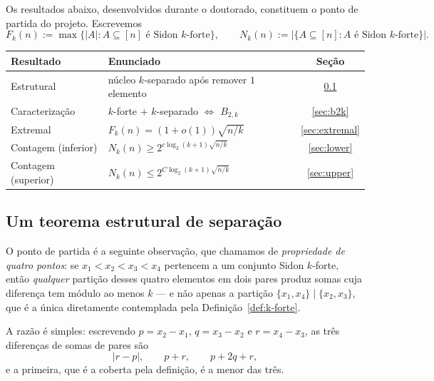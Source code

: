 \documentclass[11pt,a4paper]{article}
\theoremstyle{definition}
\theoremstyle{remark}
\begin{document}
Os resultados abaixo, desenvolvidos durante o doutorado, constituem o
ponto de partida do projeto. Escrevemos
\[
  F_k(n):=\max\{|A|:A\subseteq[n]\text{ é Sidon \(k\)-forte}\},
  \qquad
  N_k(n):=\bigl|\{A\subseteq[n]:A\text{ é Sidon \(k\)-forte}\}\bigr| .
\]

\begin{center}
  \renewcommand{\arraystretch}{1.4}
  \begin{tabular}{llc}
    \hline
    \textbf{Resultado}              & \textbf{Enunciado}                                & \textbf{Seção}     \\
    \hline
    Estrutural                      & núcleo \(k\)-separado após remover \(1\) elemento
                                    & \ref{sec:estrutural}                                                   \\
    Caracterização                  & \(k\)-forte \(+\) \(k\)-separado
    \(\Leftrightarrow\) \(B_{2,k}\) & \ref{sec:b2k}                                                          \\
    Extremal                        & \(F_k(n)=(1+o(1))\sqrt{n/k}\)                     & \ref{sec:extremal} \\
    Contagem (inferior)             & \(N_k(n)\geq2^{c\log_2(k+1)\sqrt{n/k}}\)
                                    & \ref{sec:lower}                                                        \\
    Contagem (superior)             & \(N_k(n)\leq2^{C\log_2(k+1)\sqrt{n/k}}\)
                                    & \ref{sec:upper}                                                        \\
    \hline
  \end{tabular}
\end{center}

\subsection{Um teorema estrutural de separação}
\label{sec:estrutural}

O ponto de partida é a seguinte observação, que chamamos de
\emph{propriedade de quatro pontos}: se \(x_1<x_2<x_3<x_4\) pertencem a
um conjunto Sidon \(k\)-forte, então \emph{qualquer} partição desses
quatro elementos em dois pares produz somas cuja diferença tem módulo ao
menos \(k\) --- e não apenas a partição \(\{x_1,x_4\}\mid\{x_2,x_3\}\),
que é a única diretamente contemplada pela Definição~\ref{def:k-forte}.

A razão é simples: escrevendo \(p=x_2-x_1\), \(q=x_3-x_2\) e
\(r=x_4-x_3\), as três diferenças de somas de pares são
\[
  |r-p|,\qquad p+r,\qquad p+2q+r,
\]
e a primeira, que é a coberta pela definição, é a menor das três.
\end{document}
